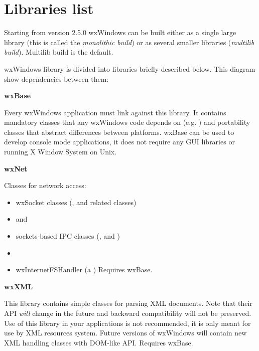 \chapter{Libraries list}\label{librarieslist}
%
\setfooter{\thepage}{}{}{}{}{\thepage}%

Starting from version 2.5.0 wxWindows can be built either as a single large
library (this is called the {\it monolithic build}) or as several smaller
libraries ({\it multilib build}). Multilib build is the default.

wxWindows library is divided into libraries briefly described below. This
diagram show dependencies between them:

\begin{center}
\end{center}

{\large {\bf wxBase}}

Every wxWindows application must link against this library. It contains
mandatory classes that any wxWindows code depends on (e.g.
) and portability classes that abstract
differences between platforms. wxBase can be used to develop console mode
applications, it does not require any GUI libraries or running X Window System
on Unix.

{\large {\bf wxNet}}

Classes for network access:

\begin{itemize}
\item{ wxSocket classes (,
        and related classes) }
\item{  and
        }
\item{ sockets-based IPC classes (,
        and
       ) }
\item{  }
\item{ wxInternetFSHandler (a ) }
Requires wxBase.
\end{itemize}

{\large {\bf wxXML}}

This library contains simple classes for parsing XML documents. Note that
their API {\em will} change in the future and backward
compatibility will not be preserved. Use of this library in your applications
is not recommended, it is only meant for use by XML resources system. Future
versions of wxWindows will contain new XML handling classes with DOM-like API.
Requires wxBase.

